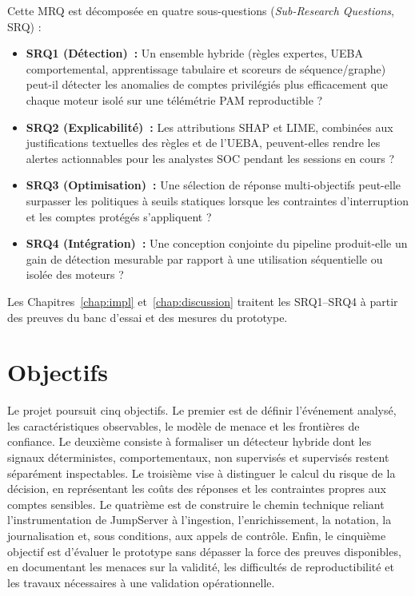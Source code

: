 \documentclass[11pt,a4paper,oneside]{report}
\theoremstyle{definition}
\theoremstyle{plain}
\begin{document}
Cette MRQ est décomposée en quatre sous-questions (\emph{Sub-Research
Questions}, SRQ) :
\begin{itemize}[leftmargin=1.5em]
  \item \textbf{SRQ1 (Détection)~:} Un ensemble hybride (règles expertes, UEBA
  comportemental, apprentissage tabulaire et scoreurs de séquence/graphe)
  peut-il détecter les anomalies de comptes privilégiés plus efficacement que
  chaque moteur isolé sur une télémétrie PAM reproductible ?
  \item \textbf{SRQ2 (Explicabilité)~:} Les attributions SHAP et LIME,
  combinées aux justifications textuelles des règles et de l'UEBA,
  peuvent-elles rendre les alertes actionnables pour les analystes SOC
  pendant les sessions en cours ?
  \item \textbf{SRQ3 (Optimisation)~:} Une sélection de réponse
  multi-objectifs peut-elle surpasser les politiques à seuils statiques
  lorsque les contraintes d'interruption et les comptes protégés
  s'appliquent ?
  \item \textbf{SRQ4 (Intégration)~:} Une conception conjointe du pipeline
  produit-elle un gain de détection mesurable par rapport à une utilisation
  séquentielle ou isolée des moteurs ?
\end{itemize}

Les Chapitres~\ref{chap:impl} et~\ref{chap:discussion} traitent les
SRQ1--SRQ4 à partir des preuves du banc d'essai et des mesures du prototype.

\section{Objectifs}
\label{sec:intro-objectives}

Le projet poursuit cinq objectifs. Le premier est de définir l'événement
analysé, les caractéristiques observables, le modèle de menace et les
frontières de confiance. Le deuxième consiste à formaliser un détecteur
hybride dont les signaux déterministes, comportementaux, non supervisés et
supervisés restent séparément inspectables. Le troisième vise à distinguer le
calcul du risque de la décision, en représentant les coûts des réponses et les
contraintes propres aux comptes sensibles. Le quatrième est de construire le
chemin technique reliant l'instrumentation de JumpServer à l'ingestion,
l'enrichissement, la notation, la journalisation et, sous conditions, aux
appels de contrôle. Enfin, le cinquième objectif est d'évaluer le prototype
sans dépasser la force des preuves disponibles, en documentant les menaces sur
la validité, les difficultés de reproductibilité et les travaux nécessaires à
une validation opérationnelle.
\end{document}
